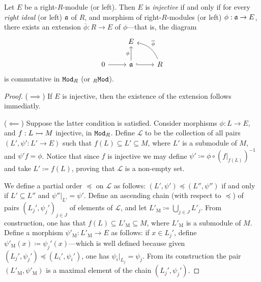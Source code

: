 \begin{theorem}
\label{thm:baer-criterion}
Let \(E\) be a right-\(R\)-module (or left). Then \(E\) is \emph{injective} if
and only if for every \emph{right ideal} (or left) \(\mathfrak{a}\) of \(R\), and
morphism of right-\(R\)-modules (or left) \(\phi: \mathfrak{a} \to E\), there exists
an extension \(\overline{\phi}: R \to E\) of \(\phi\)---that is, the diagram
\[
\begin{tikzcd}
&E & \\
0 \ar[r] &\ideal a \ar[r, hook] \ar[u, "\phi"]
&R \ar[lu, bend right, "\overline{\phi}"']
\end{tikzcd}
\]
is commutative in \({\texttt{Mod}_{R}}\) (or \({{}_{R}\texttt{Mod}}\)).
\end{theorem}

\begin{proof}
(\(\implies\)) If \(E\) is injective, then the existence of the extension
follows immediatly.

(\(\impliedby\)) Suppose the latter condition is satisfied. Consider morphisms
\(\phi: L \to E\), and \(f: L \rightarrowtail M\) injective, in \({\texttt{Mod}_{R}}\). Define
\(\mathcal{L}\) to be the collection of all pairs \((L', \psi': L' \to E)\) such
that \(f(L) \subseteq L' \subseteq M\), where \(L'\) is a submodule of \(M\),
and \(\psi' f = \phi\). Notice that since \(f\) is injective we may define
\(\psi' \coloneq \phi \circ (f|_{f(L)})^{-1}\) and take \(L' \coloneq f(L)\),
proving that \(\mathcal{L}\) is a non-empty set.

We define a partial order \(\preceq\) on \(\mathcal{L}\) as follows:
\((L', \psi') \preceq (L'', \psi'')\) if and only if \(L' \subseteq L''\) and
\(\psi''|_{L'} = \psi'\). Define an ascending chain (with respect to
\(\preceq\)) of pairs \((L_j', \psi_j')_{j \in J}\) of elements of
\(\mathcal{L}\), and let \(L'_{\text{M}} \coloneq \bigcup_{j \in J} L'_j\). From
construction, one has that \(f(L) \subseteq L'_{\text{M}} \subseteq M\), where
\(L'_{\text{M}}\) is a submodule of \(M\). Define a morphism
\(\psi'_{\text{M}}: L'_{\text{M}} \to E\) as follows: if \(x \in L_j'\), define
\(\psi'_{\text{M}}(x) \coloneq \psi_j'(x)\)---which is well defined because
given \((L_j', \psi_j') \preceq (L_i', \psi_i')\), one has
\(\psi_i|_{L_j} = \psi_j\). From its construction the pair
\((L'_{\text{M}}, \psi'_{\text{M}})\) is a maximal element of the chain
\((L_j', \psi_j')\).


\end{proof}
